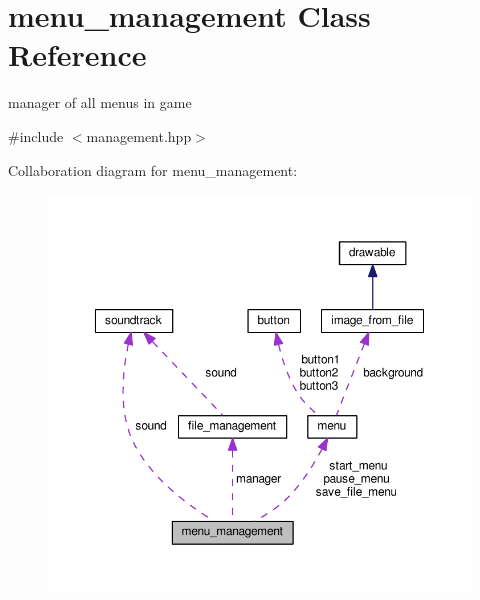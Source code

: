 \hypertarget{classmenu__management}{}\section{menu\+\_\+management Class Reference}
\label{classmenu__management}


manager of all menu\textquotesingle{}s in game  




{\ttfamily \#include $<$management.\+hpp$>$}



Collaboration diagram for menu\+\_\+management\+:
\nopagebreak
\begin{figure}[H]
\begin{center}
\leavevmode
\includegraphics[width=350pt]{classmenu__management__coll__graph}
\end{center}
\end{figure}
